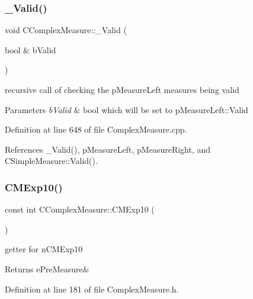 \subsubsection{\texorpdfstring{\+\_\+\+Valid()}{\_Valid()}}
{\footnotesize\ttfamily void C\+Complex\+Measure\+::\+\_\+\+Valid (\begin{DoxyParamCaption}\item[{bool \&}]{b\+Valid }\end{DoxyParamCaption})\hspace{0.3cm}{\ttfamily [protected]}}



recursive call of checking the p\+Measure\+Left measures being valid 


\begin{DoxyParams}{Parameters}
{\em b\+Valid} & bool which will be set to p\+Measure\+Left\+::\+Valid \\
\hline
\end{DoxyParams}


Definition at line 648 of file Complex\+Measure.\+cpp.



References \+\_\+\+Valid(), p\+Measure\+Left, p\+Measure\+Right, and C\+Simple\+Measure\+::\+Valid().

\mbox{\label{classCComplexMeasure_a06355541d6d9b843b9d68156a0297f51}} 
\subsubsection{\texorpdfstring{C\+M\+Exp10()}{CMExp10()}\hspace{0.1cm}{\footnotesize\ttfamily [1/2]}}
{\footnotesize\ttfamily const int C\+Complex\+Measure\+::\+C\+M\+Exp10 (\begin{DoxyParamCaption}{ }\end{DoxyParamCaption})\hspace{0.3cm}{\ttfamily [inline]}}



getter for n\+C\+M\+Exp10 

\begin{DoxyReturn}{Returns}
e\+Pre\+Measure\& 
\end{DoxyReturn}


Definition at line 181 of file Complex\+Measure.\+h.



